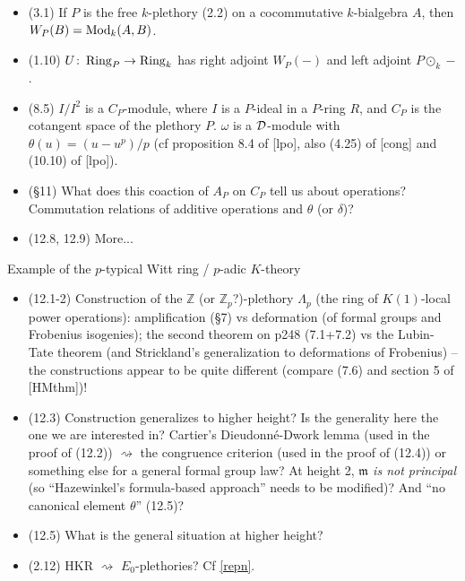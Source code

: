 \documentclass{rs}
\theoremstyle{definition}
\theoremstyle{remark}
\def\co{\colon\thinspace}
\newcommand{\mb}[1]{\mathbb{#1}}
\newcommand{\mf}[1]{\mathfrak{#1}}
\renewcommand{\=}{\approx}
\renewcommand{\-}{\sim}
\numberwithin{equation}{section}
\numberwithin{thm}{section}
\begin{document}
\begin{itemize}
 \item (3.1) If $P$ is the free $k$-plethory (2.2) on a cocommutative $k$-bialgebra $A$, then $W_P(B) = {\rm Mod}_k (A,B)$.

 \item (1.10) $U \co {\rm Ring}_P \to {\rm Ring}_k$ has right adjoint $W_P(-)$ and left adjoint $P \odot_k -$.

 \item (8.5) $I/I^2$ is a $C_P$-module, where $I$ is a $P$-ideal in a $P$-ring $R$, and $C_P$ is the cotangent space of the plethory $P$. 
 $\omega$ is a $\cal D$-module with $\theta(u) = (u - u^p)/p$ (cf proposition 8.4 of [lpo], also (4.25) of [cong] and (10.10) of [lpo]).

 \item (\S 11) What does this coaction of $A_P$ on $C_P$ tell us about operations? Commutation relations of additive operations and $\theta$ (or $\delta$)?

 \item (12.8, 12.9) More...
\end{itemize}

Example of the $p$-typical Witt ring / $p$-adic $K$-theory
\begin{itemize}
 \item (12.1-2) Construction of the $\mb Z$ (or $\mb Z_p$?)-plethory $\Lambda_p$ (the ring of $K(1)$-local power operations): 
 amplification (\S 7) vs deformation (of formal groups and Frobenius isogenies); 
 the second theorem on p248 (7.1+7.2) vs the Lubin-Tate theorem (and Strickland's generalization to deformations of Frobenius) 
 -- the constructions appear to be quite different (compare (7.6) and section 5 of [HMthm])!

 \item (12.3) Construction generalizes to higher height? Is the generality here the one we are interested in? 
 Cartier's Dieudonn\'e-Dwork lemma (used in the proof of (12.2)) $\rightsquigarrow$ the congruence criterion (used in the proof of (12.4)) or something else for a general formal group law? 
 At height 2, {\em $\mf m$ is not principal} (so ``Hazewinkel's formula-based approach'' needs to be modified)? And ``no canonical element $\theta$'' (12.5)?

 \item (12.5) What is the general situation at higher height?

 \item (2.12) HKR $\rightsquigarrow$ $E_0$-plethories? Cf \ref{repn}.
\end{itemize}
\end{document}
